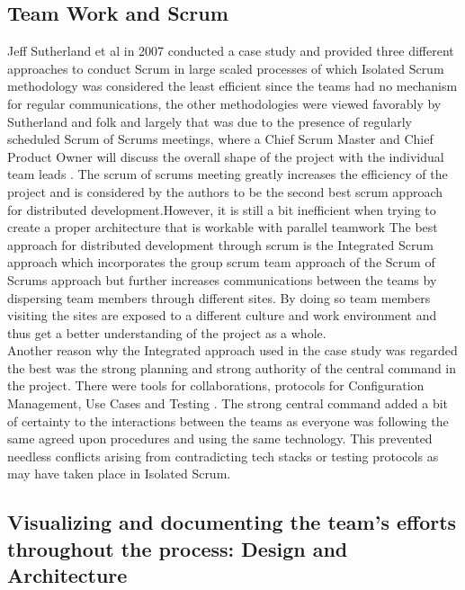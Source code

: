 \documentclass[sigplan,screen]{acmart}
\begin{document}
\subsection{Team Work and Scrum}
Jeff Sutherland et al in 2007 conducted a case study and provided three different approaches to conduct Scrum in large scaled processes of which Isolated Scrum methodology was considered the least efficient since the teams had no mechanism for regular communications, the other methodologies were viewed favorably by Sutherland and folk and largely that was due to the presence of regularly scheduled Scrum of Scrums meetings, where a Chief Scrum Master and Chief Product Owner will discuss the overall shape of the project with the individual team leads \cite{Jeff}. The scrum of scrums meeting greatly increases the efficiency of the project and is considered by the authors to be the second best scrum approach for distributed development.However, it is still a bit inefficient when trying to create a proper architecture that is workable with parallel teamwork \cite{Dingsøyr14} The best approach for distributed development through scrum is the Integrated Scrum approach which incorporates the group scrum team approach of the Scrum of Scrums approach but further increases communications between the teams by dispersing team members through different sites. By doing so team members visiting the sites are exposed to a different culture and work environment and thus get a better understanding of the project as a whole.\\ 

Another reason why the Integrated approach used in the case study was regarded the best was the strong planning and strong authority of the central command in the project. There were tools for collaborations, protocols for Configuration Management, Use Cases and Testing \cite{Jeff}. The strong central command added a bit of certainty to the interactions between the teams as everyone was following the same agreed upon procedures and using the same technology. This prevented needless conflicts arising from contradicting tech stacks or testing protocols as may have taken place in Isolated Scrum.\\

\subsection{Visualizing and documenting the team's efforts throughout the process: Design and Architecture}





%
\begin{acks}

\end{acks}

%


\end{document}
